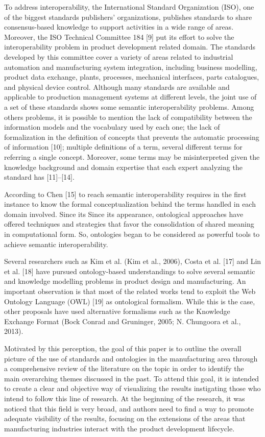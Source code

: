 \documentclass[peerreview]{IEEEtran}
\begin{document}
To address interoperability, the International Standard Organization (ISO), one of the biggest standards publishers’ organizations, publishes standards to share consensus-based knowledge to support activities in a wide range of areas. Moreover, the ISO Technical Committee 184 \cite{}[9] put its effort to solve the interoperability problem in product development related domain. The standards developed by this committee cover a variety of areas related to industrial automation and manufacturing system integration, including business modelling, product data exchange, plants, processes, mechanical interfaces, parts catalogues, and physical device control. Although many standards are available and applicable to production management systems at different levels, the joint use of a set of these standards shows some semantic interoperability problems. Among others problems, it is possible to mention the lack of compatibility between the information models and the vocabulary used by each one; the lack of formalization in the definition of concepts that prevents the automatic processing of information \cite{}[10]; multiple definitions of a term, several different terms for referring a single concept. Moreover, some terms may be misinterpreted given the knowledge background and domain expertise that each expert analyzing the standard has \cite{}[11]–[14].


According to Chen \cite{}[15] to reach semantic interoperability requires in the first instance to know the formal conceptualization behind the terms handled in each domain involved. Since its Since its appearance, ontological approaches have offered techniques and strategies that favor the consolidation of shared meaning in computational form. So, ontologies began to be considered as powerful tools to achieve semantic interoperability.


Several researchers such as Kim et al. \cite{}(Kim et al., 2006), Costa et al. \cite{}[17] and Lin et al. \cite{}[18] have pursued ontology-based understandings to solve several semantic and knowledge modelling problems in product design and manufacturing. An important observation is that most of the related works tend to exploit the Web Ontology Language (OWL) \cite{}[19] as ontological formalism. While this is the case, other proposals have used alternative formalisms such as the Knowledge Exchange Format \cite{}(Bock Conrad and Gruninger, 2005; N. Chungoora et al., 2013).


Motivated by this perception, the goal of this paper is to outline the overall picture of the use of standards and ontologies in the manufacturing area through a comprehensive review of the literature on the topic in order to identify the main overarching themes discussed in the past. To attend this goal, it is intended to create a clear and objective way of visualizing the results instigating those who intend to follow this line of research. At the beginning of the research, it was noticed that this field is very broad, and authors need to find a way to promote adequate visibility of the results, focusing on the extensions of the areas that manufacturing industries interact with the product development lifecycle.
\end{document}
